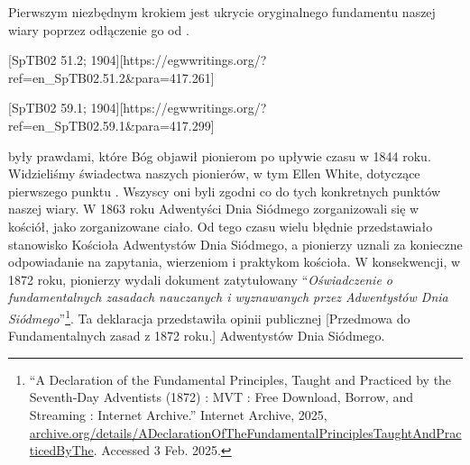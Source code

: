 Pierwszym niezbędnym krokiem jest ukrycie oryginalnego fundamentu naszej wiary poprzez odłączenie go od .

[SpTB02 51.2; 1904][https://egwwritings.org/?ref=en\_SpTB02.51.2&para=417.261]

[SpTB02 59.1; 1904][https://egwwritings.org/?ref=en\_SpTB02.59.1&para=417.299]

 były prawdami, które Bóg objawił pionierom po upływie czasu w 1844 roku. Widzieliśmy świadectwa naszych pionierów, w tym Ellen White, dotyczące pierwszego punktu . Wszyscy oni byli zgodni co do tych konkretnych punktów naszej wiary. W 1863 roku Adwentyści Dnia Siódmego zorganizowali się w kościół, jako zorganizowane ciało. Od tego czasu wielu błędnie przedstawiało stanowisko Kościoła Adwentystów Dnia Siódmego, a pionierzy uznali za konieczne odpowiadanie na zapytania,  wierzeniom i praktykom kościoła. W konsekwencji, w 1872 roku, pionierzy wydali dokument zatytułowany “\textit{Oświadczenie o fundamentalnych zasadach nauczanych i wyznawanych przez Adwentystów Dnia Siódmego}”\footnote{“A Declaration of the Fundamental Principles, Taught and Practiced by the Seventh-Day Adventists (1872) : MVT : Free Download, Borrow, and Streaming : Internet Archive.” Internet Archive, 2025, \href{https://archive.org/details/ADeclarationOfTheFundamentalPrinciplesTaughtAndPracticedByThe}{archive.org/details/ADeclarationOfTheFundamentalPrinciplesTaughtAndPracticedByThe}. Accessed 3 Feb. 2025.}. Ta deklaracja przedstawiła opinii publicznej [Przedmowa do Fundamentalnych zasad z 1872 roku.] Adwentystów Dnia Siódmego.

